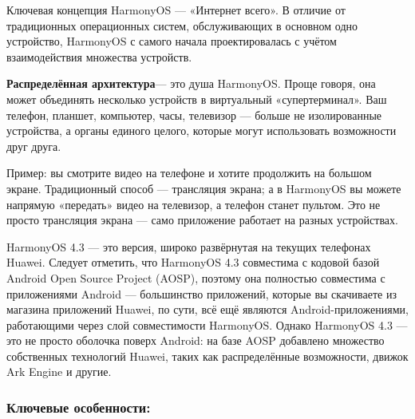 


Ключевая концепция HarmonyOS — «Интернет всего». В отличие от традиционных операционных систем, обслуживающих в основном одно устройство, HarmonyOS с самого начала проектировалась с учётом взаимодействия множества устройств.

\textbf{Распределённая архитектура}— это душа HarmonyOS. Проще говоря, она может объединять несколько устройств в виртуальный «супертерминал». Ваш телефон, планшет, компьютер, часы, телевизор — больше не изолированные устройства, а органы единого целого, которые могут использовать возможности друг друга.

Пример: вы смотрите видео на телефоне и хотите продолжить на большом экране. Традиционный способ — трансляция экрана; а в HarmonyOS вы можете напрямую «передать» видео на телевизор, а телефон станет пультом. Это не просто трансляция экрана — само приложение работает на разных устройствах.


HarmonyOS 4.3 — это версия, широко развёрнутая на текущих телефонах Huawei. Следует отметить, что HarmonyOS 4.3 совместима с кодовой базой Android Open Source Project (AOSP), поэтому она полностью совместима с приложениями Android — большинство приложений, которые вы скачиваете из магазина приложений Huawei, по сути, всё ещё являются Android-приложениями, работающими через слой совместимости HarmonyOS. Однако HarmonyOS 4.3 — это не просто оболочка поверх Android: на базе AOSP добавлено множество собственных технологий Huawei, таких как распределённые возможности, движок Ark Engine и другие.

\subsubsection*{Ключевые особенности:}

